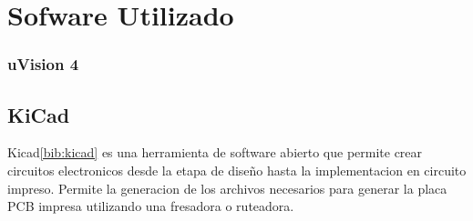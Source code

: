 \section{Sofware Utilizado} %
\label{sec:sofware_utilizado}


\subsubsection{uVision 4} %
\label{ssub:uvision_4}

\mu


\subsection{KiCad} %
\label{sub:kicad}

Kicad\ref{bib:kicad} es una herramienta de software abierto que permite crear circuitos electronicos desde la etapa de dise\~no hasta la implementacion en circuito impreso. Permite la generacion de los archivos necesarios para generar la placa PCB impresa utilizando una fresadora o ruteadora.  



\clearpage



